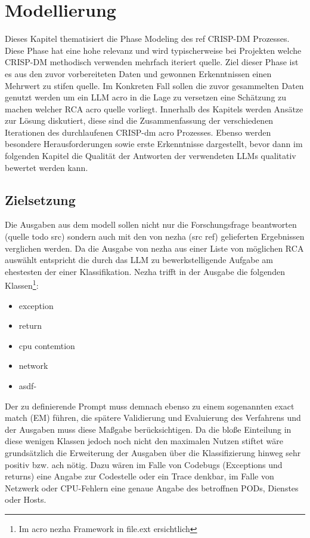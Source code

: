 \chapter{Modellierung}
\label{cha:Modellierung}

Dieses Kapitel thematisiert die Phase Modeling des ref CRISP-DM Prozesses. Diese Phase hat eine hohe relevanz und wird typischerweise bei Projekten welche CRISP-DM methodisch verwenden mehrfach iteriert quelle. Ziel dieser Phase ist es aus den zuvor vorbereiteten Daten und gewonnen Erkenntnissen einen Mehrwert zu stifen quelle. Im Konkreten Fall sollen die zuvor gesammelten Daten genutzt werden um ein LLM acro in die Lage zu versetzen eine Schätzung zu machen welcher RCA acro quelle vorliegt. Innerhalb des Kapitels werden Ansätze zur Lösung diskutiert, diese sind die Zusammenfassung der verschiedenen Iterationen des durchlaufenen CRISP-dm acro Prozesses. Ebenso werden besondere Herausforderungen sowie erste Erkenntnisse dargestellt, bevor dann im folgenden Kapitel die Qualität der Antworten der verwendeten LLMs qualitativ bewertet werden kann. 

\section{Zielsetzung}
\label{sec:Zielsetzung}

Die Ausgaben aus dem modell sollen nicht nur die Forschungsfrage beantworten (quelle todo src) sondern auch mit den von nezha (src ref) gelieferten Ergebnissen verglichen werden. Da die Ausgabe von nezha aus einer Liste von möglichen RCA auswählt entspricht die durch das LLM zu bewerkstelligende Aufgabe am ehestesten der einer Klassifikation. Nezha trifft in der Ausgabe die folgenden Klassen\footnote{Im acro nezha Framework in file.ext ersichtlich}:

\begin{itemize}
\item exception
\item return
\item cpu contemtion
\item network
\item asdf-
\end{itemize}

Der zu definierende Prompt muss demnach ebenso zu einem sogenannten exact match (EM) führen, die spätere Validierung und Evaluierung des Verfahrens und der Ausgaben muss diese Maßgabe berücksichtigen. Da die bloße Einteilung in diese wenigen Klassen jedoch noch nicht den maximalen Nutzen stiftet wäre grundsätzlich die Erweiterung der Ausgaben über die Klassifizierung hinweg sehr positiv bzw. ach nötig. Dazu wären im Falle von Codebugs (Exceptions und returns) eine Angabe zur Codestelle oder ein Trace denkbar, im Falle von Netzwerk oder CPU-Fehlern eine genaue Angabe des betroffnen PODs, Dienstes oder Hosts.

